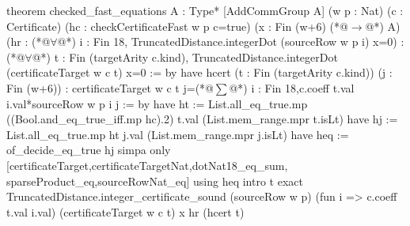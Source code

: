 theorem checked_fast_equations {A : Type*} [AddCommGroup A]
    (w p : Nat) (c : Certificate) (hc : checkCertificateFast w p c=true)
    (x : Fin (w+6) (*@$\to$@*) A)
    (hr : (*@$\forall$@*) i : Fin 18, TruncatedDistance.integerDot (sourceRow w p i) x=0) :
    (*@$\forall$@*) t : Fin (targetArity c.kind),
      TruncatedDistance.integerDot (certificateTarget w c t) x=0 := by
  have hcert (t : Fin (targetArity c.kind)) (j : Fin (w+6)) :
      certificateTarget w c t j=(*@$\sum$@*) i : Fin 18,c.coeff t.val i.val*sourceRow w p i j := by
    have ht := List.all_eq_true.mp ((Bool.and_eq_true_iff.mp hc).2)
      t.val (List.mem_range.mpr t.isLt)
    have hj := List.all_eq_true.mp ht j.val (List.mem_range.mpr j.isLt)
    have heq := of_decide_eq_true hj
    simpa only [certificateTarget,certificateTargetNat,dotNat18_eq_sum,
      sparseProduct_eq,sourceRowNat_eq] using heq
  intro t
  exact TruncatedDistance.integer_certificate_sound (sourceRow w p)
    (fun i => c.coeff t.val i.val) (certificateTarget w c t) x hr (hcert t)
